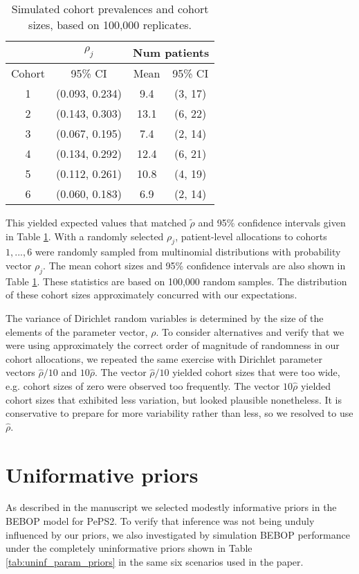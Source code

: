 \documentclass{article}
\begin{document}
\begin{table}[h]
	\centering
	\begin{tabular}{|c|c|c|c|}
		\hline 
		& $\rho_j$ & \multicolumn{2}{|c|}{Num patients} \\ 
		\hline 
		Cohort & 95\% CI & Mean & 95\% CI \\ 
		\hline 
		1 & (0.093, 0.234) & 9.4 & (3, 17) \\ 
		2 & (0.143, 0.303) & 13.1 & (6, 22) \\ 
		3 & (0.067, 0.195) & 7.4 & (2, 14) \\ 
		4 & (0.134, 0.292) & 12.4 & (6, 21) \\ 
		5 & (0.112, 0.261) & 10.8 & (4, 19) \\ 
		6 & (0.060, 0.183) & 6.9 & (2, 14) \\ 
		\hline 
	\end{tabular} 
	\caption{Simulated cohort prevalences and cohort sizes, based on 100,000 replicates.}
	\label{tab:cohorts.sizes}
\end{table}

This yielded expected values that matched $\tilde{\rho}$ and 95\% confidence intervals given in Table \ref{tab:cohorts.sizes}.
With a randomly selected $\rho_j$, patient-level allocations to cohorts $1,...,6$ were randomly sampled from multinomial distributions with probability vector $\rho_j$.
The mean cohort sizes and 95\% confidence intervals are also shown in Table \ref{tab:cohorts.sizes}.
These statistics are based on 100,000 random samples.
The distribution of these cohort sizes approximately concurred with our expectations.

The variance of Dirichlet random variables is determined by the size of the elements of the parameter vector, $\rho$.
To consider alternatives and verify that we were using approximately the correct order of magnitude of randomness in our cohort allocations, we repeated the same exercise with Dirichlet parameter vectors $\hat{\rho} / 10$ and $10 \hat{\rho}$.
The vector $\hat{\rho} / 10$ yielded cohort sizes that were too wide, e.g. cohort sizes of zero were observed too frequently.
The vector $10 \hat{\rho}$ yielded cohort sizes that exhibited less variation, but looked plausible nonetheless.
It is conservative to prepare for more variability rather than less, so we resolved to use $\hat{\rho}$.



\newpage
\section{Uniformative priors}
\label{s:uninformative.prior}
As described in the manuscript we selected modestly informative priors in the BEBOP model for PePS2.
To verify that inference was not being unduly influenced by our priors, we also investigated by simulation BEBOP performance under the completely uninformative priors shown in Table \ref{tab:uninf_param_priors} in the same six scenarios used in the paper.
\end{document}
